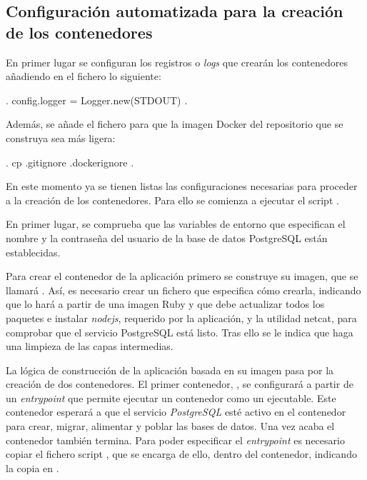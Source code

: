 \subsection{Configuración automatizada para la creación de los contenedores}

En primer lugar se configuran los registros o \textit{logs} que crearán los contenedores añadiendo en el fichero  lo siguiente:

\begin{codelisting}
\label{code:application.rb}
\begin{code}
.
config.logger = Logger.new(STDOUT)
.
\end{code}
\end{codelisting}

Además, se añade el fichero  para que la imagen Docker del repositorio que se construya sea más ligera:

\begin{codelisting}
\label{code:.dockerignore}
\begin{code}
.
cp .gitignore .dockerignore
.
\end{code}
\end{codelisting}

En este momento ya se tienen listas las configuraciones necesarias para proceder a la creación de los contenedores. Para ello se comienza a ejecutar el script .

En primer lugar, se comprueba que las variables de entorno que especifican el nombre y la contraseña del usuario de la base de datos PostgreSQL están establecidas.

Para crear el contenedor de la aplicación primero se construye su imagen, que se llamará . Así, es necesario crear un fichero  que especifica cómo crearla, indicando que lo hará a partir de una imagen Ruby y que debe actualizar todos los paquetes e instalar \textit{nodejs}, requerido por la aplicación, y la utilidad netcat, para comprobar que el servicio PostgreSQL está listo. Tras ello se le indica que haga una limpieza de las capas intermedias. 

La lógica de construcción de la aplicación basada en su imagen pasa por la creación de dos contenedores. El primer contenedor, , se configurará a partir de un \textit{entrypoint} que permite ejecutar un contenedor como un ejecutable. Este contenedor esperará a que el servicio \textit{PostgreSQL} esté activo en el contenedor  para crear, migrar, alimentar y poblar las bases de datos. Una vez acaba el contenedor también termina. Para poder especificar el \textit{entrypoint} es necesario copiar el fichero script , que se encarga de ello, dentro del contenedor, indicando la copia en . 

